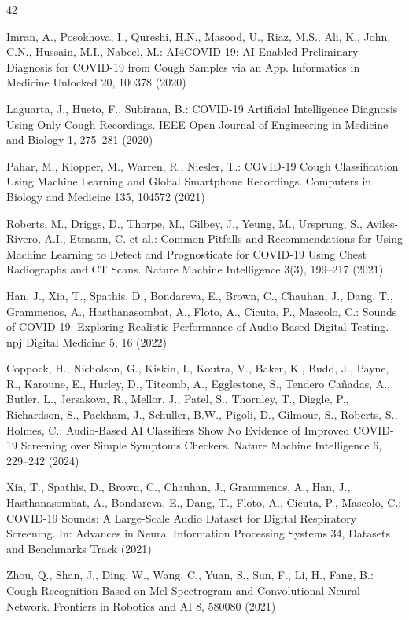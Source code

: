 \documentclass[pdflatex,sn-mathphys-num]{sn-jnl}
\begin{document}
\begin{thebibliography}{42}

Imran, A., Posokhova, I., Qureshi, H.N., Masood, U., Riaz, M.S., Ali, K., John, C.N., Hussain, M.I., Nabeel, M.: AI4COVID-19: AI Enabled Preliminary Diagnosis for COVID-19 from Cough Samples via an App. Informatics in Medicine Unlocked 20, 100378 (2020)

Laguarta, J., Hueto, F., Subirana, B.: COVID-19 Artificial Intelligence Diagnosis Using Only Cough Recordings. IEEE Open Journal of Engineering in Medicine and Biology 1, 275–281 (2020)

Pahar, M., Klopper, M., Warren, R., Niesler, T.: COVID-19 Cough Classification Using Machine Learning and Global Smartphone Recordings. Computers in Biology and Medicine 135, 104572 (2021)

Roberts, M., Driggs, D., Thorpe, M., Gilbey, J., Yeung, M., Ursprung, S., Aviles-Rivero, A.I., Etmann, C. et al.: Common Pitfalls and Recommendations for Using Machine Learning to Detect and Prognosticate for COVID-19 Using Chest Radiographs and CT Scans. Nature Machine Intelligence 3(3), 199–217 (2021)

Han, J., Xia, T., Spathis, D., Bondareva, E., Brown, C., Chauhan, J., Dang, T., Grammenos, A., Hasthanasombat, A., Floto, A., Cicuta, P., Mascolo, C.: Sounds of COVID-19: Exploring Realistic Performance of Audio-Based Digital Testing. npj Digital Medicine 5, 16 (2022)

Coppock, H., Nicholson, G., Kiskin, I., Koutra, V., Baker, K., Budd, J., Payne, R., Karoune, E., Hurley, D., Titcomb, A., Egglestone, S., Tendero Ca{\~n}adas, A., Butler, L., Jersakova, R., Mellor, J., Patel, S., Thornley, T., Diggle, P., Richardson, S., Packham, J., Schuller, B.W., Pigoli, D., Gilmour, S., Roberts, S., Holmes, C.: Audio-Based AI Classifiers Show No Evidence of Improved COVID-19 Screening over Simple Symptoms Checkers. Nature Machine Intelligence 6, 229–242 (2024)

Xia, T., Spathis, D., Brown, C., Chauhan, J., Grammenos, A., Han, J., Hasthanasombat, A., Bondareva, E., Dang, T., Floto, A., Cicuta, P., Mascolo, C.: COVID-19 Sounds: A Large-Scale Audio Dataset for Digital Respiratory Screening. In: Advances in Neural Information Processing Systems 34, Datasets and Benchmarks Track (2021)

Zhou, Q., Shan, J., Ding, W., Wang, C., Yuan, S., Sun, F., Li, H., Fang, B.: Cough Recognition Based on Mel-Spectrogram and Convolutional Neural Network. Frontiers in Robotics and AI 8, 580080 (2021)


\end{thebibliography}
\end{document}
